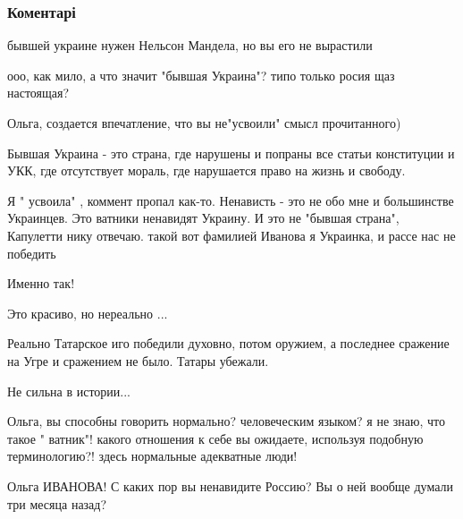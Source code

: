  
 
 
 
 
\subsubsection{Коментарі}

\begin{itemize} %
бывшей украине нужен Нельсон Мандела, но вы его не вырастили

ооо, как мило, а что значит "бывшая Украина"? типо только росия щаз настоящая?

Ольга, создается впечатление, что вы не"усвоили" смысл прочитанного)


Бывшая Украина - это страна, где нарушены и попраны все статьи конституции и
УКК, где отсутствует мораль, где нарушается право на жизнь и свободу.


Я " усвоила" , коммент пропал как-то. Ненависть - это не обо мне и большинстве
Украинцев. Это ватники ненавидят Украину. И это не "бывшая страна", Капулетти
нику отвечаю. такой вот фамилией Иванова я Украинка, и рассе нас не победить


Именно так!

Это красиво, но нереально ...

Реально Татарское иго победили духовно, потом оружием, а последнее сражение на Угре и сражением не было. Татары убежали.

Не сильна в истории...


Ольга, вы способны говорить нормально? человеческим языком? я не знаю, что
такое " ватник"! какого отношения к себе вы ожидаете, используя подобную
терминологию?! здесь нормальные адекватные люди!

Ольга ИВАНОВА! С каких пор вы ненавидите Россию? Вы о ней вообще думали три месяца назад?


\end{itemize}
